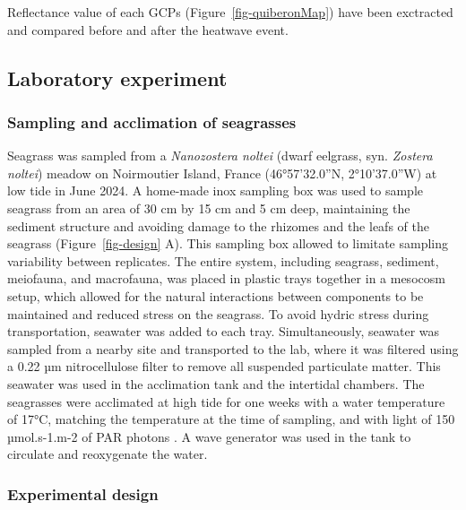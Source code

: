 \documentclass[
  number]{elsarticle}
\begin{document}
Reflectance value of each GCPs (Figure~\ref{fig-quiberonMap}) have been
exctracted and compared before and after the heatwave event.

\subsection{Laboratory experiment}\label{laboratory-experiment}

\subsubsection{Sampling and acclimation of
seagrasses}\label{sampling-and-acclimation-of-seagrasses}

Seagrass was sampled from a \emph{Nanozostera noltei} (dwarf eelgrass,
syn. \emph{Zostera noltei}) meadow on Noirmoutier Island, France
(46°57'32.0''N, 2°10'37.0''W) at low tide in June 2024. A home-made inox
sampling box was used to sample seagrass from an area of 30 cm by 15 cm
and 5 cm deep, maintaining the sediment structure and avoiding damage to
the rhizomes and the leafs of the seagrass (Figure~\ref{fig-design} A).
This sampling box allowed to limitate sampling variability between
replicates. The entire system, including seagrass, sediment, meiofauna,
and macrofauna, was placed in plastic trays together in a mesocosm
setup, which allowed for the natural interactions between components to
be maintained and reduced stress on the seagrass. To avoid hydric stress
during transportation, seawater was added to each tray. Simultaneously,
seawater was sampled from a nearby site and transported to the lab,
where it was filtered using a 0.22 µm nitrocellulose filter to remove
all suspended particulate matter. This seawater was used in the
acclimation tank and the intertidal chambers. The seagrasses were
acclimated at high tide for one weeks with a water temperature of 17°C,
matching the temperature at the time of sampling, and with light of 150
µmol.s-1.m-2 of PAR photons \citep{akbar2020mangrove}. A wave generator
was used in the tank to circulate and reoxygenate the water.

\subsubsection{Experimental design}\label{experimental-design}
\end{document}
